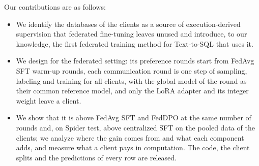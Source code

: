 Our contributions are as follows:
\begin{itemize}
\item We identify the databases of the clients as a source of
execution-derived supervision that federated fine-tuning leaves unused
and introduce, to our knowledge, the first federated training method for
Text-to-SQL that uses it.
\item We design \method{} for the federated setting: its preference
rounds start from FedAvg SFT warm-up rounds, each communication round is
one step of sampling, labeling and training for all clients, with the
global model of the round as their common reference model, and only the
LoRA adapter and its integer weight leave a client.
\item We show that it is above FedAvg SFT and FedDPO at the same number
of rounds and, on Spider test, above centralized SFT on the pooled data
of the clients; we analyze where the gain comes from and what each
component adds, and measure what a client pays in computation. The code, the client
splits and the predictions of every row are released.
\end{itemize}
